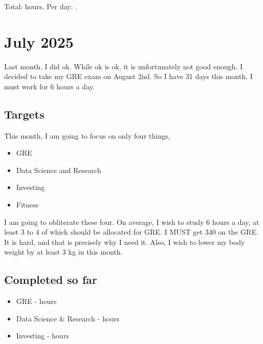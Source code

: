 \documentclass[11pt]{article}
\begin{document}
\noindent Total: \juneTOTAL{} hours. Per day: .

\vspace{0.5cm}


\section*{July 2025}


\noindent Last month, I did ok. While ok is ok, it is unfortunately not good enough. I decided to take
my GRE exam on August 2nd. So I have 31 days this month. I must work for 6 hours a day.

\subsection*{Targets}
\noindent This month, I am going to focus on only four things,
\begin{itemize}
  \item GRE
  \item Data Science and Research
  \item Investing
  \item Fitness
\end{itemize}

\noindent I am going to obliterate these four. On average, I wish to study 6 hours a day, at least 3 to 4 of
which should be allocated for GRE. I MUST get 340 on the GRE. It is hard, and that is precisely why I need it.
Also, I wish to lower my body weight by at least 3 kg in this month.

\subsection*{Completed so far}
\begin{itemize}
\itemsep0em
  \item GRE                       - \julyGRE hours
  \item Data Science \& Research  - \julyDSandRESEARCH hours
  \item Investing                 - \julyINVEST hours
\end{itemize}
\end{document}
